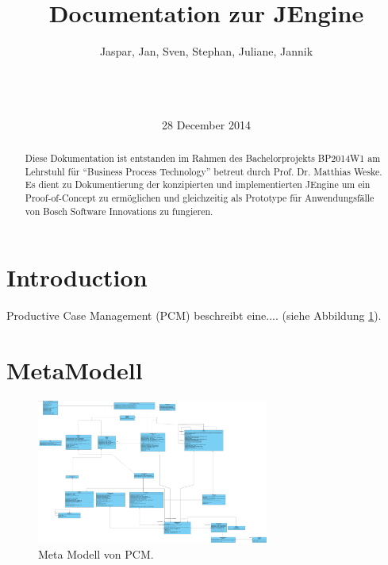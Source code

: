 \documentclass{acm_proc_article-sp}
\begin{document}
\title{Documentation zur JEngine}

%
%
\author{
\alignauthor
Jaspar, Jan, Sven, Stephan, Juliane, Jannik\\
       \\
       \\
       \\
}
\date{28 December 2014}

\maketitle

%
%
\begin{abstract}
Diese Dokumentation ist entstanden im Rahmen des Bachelorprojekts BP2014W1 am Lehrstuhl für ``Business Process Technology'' betreut durch Prof. Dr. Matthias Weske. Es dient zu Dokumentierung der konzipierten und implementierten JEngine um ein Proof-of-Concept zu ermöglichen und gleichzeitig als Prototype für Anwendungsfälle von Bosch Software Innovations zu fungieren.
\end{abstract}

%
%
\section{Introduction}
Productive Case Management (PCM) beschreibt eine.... \cite{ImplementationFrameworkPCM} (siehe Abbildung \ref{fig:PCMmetaModell}).

%
%
\section{MetaModell}

\begin{figure}
\centering
\includegraphics[width=3in]{img/MetaModell_classDiagramm.jpg}
\caption{Meta Modell von PCM.}
\label{fig:PCMmetaModell}
\end{figure}
\end{document}

